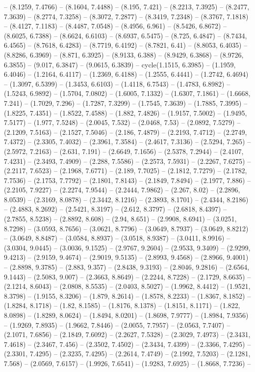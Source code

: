 -- (8.1259, 7.4766) -- (8.1604, 7.4488) -- (8.195, 7.421) -- (8.2213, 7.3925) -- (8.2477, 7.3639) -- (8.2774, 7.3258) -- (8.3072, 7.2877) -- (8.3419, 7.2348) -- (8.3767, 7.1818) -- (8.4127, 7.1183) -- (8.4487, 7.0548) -- (8.4956, 6.961) -- (8.5426, 6.8672) -- (8.6025, 6.7388) -- (8.6624, 6.6103) -- (8.6937, 6.5475) -- (8.725, 6.4847) -- (8.7434, 6.4565) -- (8.7618, 6.4283) -- (8.7719, 6.4192) -- (8.7821, 6.41) -- (8.8053, 6.4035) -- (8.8286, 6.3969) -- (8.871, 6.3925) -- (8.9133, 6.388) -- (8.9429, 6.3868) -- (8.9726, 6.3855) -- (9.017, 6.3847) -- (9.0615, 6.3839) -- cycle(1.1515, 6.3985) -- (1.1959, 6.4046) -- (1.2164, 6.4117) -- (1.2369, 6.4188) -- (1.2555, 6.4441) -- (1.2742, 6.4694) -- (1.3097, 6.5399) -- (1.3453, 6.6103) -- (1.4118, 6.7543) -- (1.4783, 6.8982) -- (1.5243, 6.9892) -- (1.5704, 7.0802) -- (1.6005, 7.1332) -- (1.6307, 7.1861) -- (1.6668, 7.241) -- (1.7029, 7.296) -- (1.7287, 7.3299) -- (1.7545, 7.3639) -- (1.7885, 7.3995) -- (1.8225, 7.4351) -- (1.8522, 7.4588) -- (1.882, 7.4826) -- (1.9157, 7.5002) -- (1.9495, 7.5177) -- (1.977, 7.5248) -- (2.0045, 7.532) -- (2.0468, 7.53) -- (2.0892, 7.5279) -- (2.1209, 7.5163) -- (2.1527, 7.5046) -- (2.186, 7.4879) -- (2.2193, 7.4712) -- (2.2749, 7.4372) -- (2.3305, 7.4032) -- (2.3961, 7.3584) -- (2.4617, 7.3136) -- (2.5294, 7.265) -- (2.5972, 7.2163) -- (2.631, 7.191) -- (2.6649, 7.1656) -- (2.5378, 7.2944) -- (2.4107, 7.4231) -- (2.3493, 7.4909) -- (2.288, 7.5586) -- (2.2573, 7.5931) -- (2.2267, 7.6275) -- (2.2117, 7.6523) -- (2.1968, 7.6771) -- (2.189, 7.7025) -- (2.1812, 7.7279) -- (2.1782, 7.7536) -- (2.1753, 7.7792) -- (2.1801, 7.8143) -- (2.1849, 7.8494) -- (2.1977, 7.886) -- (2.2105, 7.9227) -- (2.2274, 7.9544) -- (2.2444, 7.9862) -- (2.267, 8.02) -- (2.2896, 8.0539) -- (2.3169, 8.0878) -- (2.3442, 8.1216) -- (2.3893, 8.1701) -- (2.4344, 8.2186) -- (2.4883, 8.2692) -- (2.5421, 8.3197) -- (2.612, 8.3797) -- (2.6818, 8.4397) -- (2.7855, 8.5238) -- (2.8892, 8.608) -- (2.94, 8.651) -- (2.9908, 8.6941) -- (3.0251, 8.7298) -- (3.0593, 8.7656) -- (3.0621, 8.7796) -- (3.0649, 8.7937) -- (3.0649, 8.8212) -- (3.0649, 8.8487) -- (3.0584, 8.8937) -- (3.0518, 8.9387) -- (3.0411, 8.9916) -- (3.0304, 9.0445) -- (3.0036, 9.1525) -- (2.9767, 9.2604) -- (2.9533, 9.3409) -- (2.9299, 9.4213) -- (2.9159, 9.4674) -- (2.9019, 9.5135) -- (2.8993, 9.4568) -- (2.8966, 9.4001) -- (2.8898, 9.3785) -- (2.883, 9.357) -- (2.8438, 9.3193) -- (2.8046, 9.2816) -- (2.6564, 9.1443) -- (2.5083, 9.007) -- (2.3663, 8.8649) -- (2.2244, 8.7228) -- (2.1729, 8.6635) -- (2.1214, 8.6043) -- (2.0808, 8.5535) -- (2.0403, 8.5027) -- (1.9962, 8.4412) -- (1.9521, 8.3798) -- (1.9155, 8.3206) -- (1.879, 8.2614) -- (1.8578, 8.2233) -- (1.8367, 8.1852) -- (1.8284, 8.1718) -- (1.82, 8.1585) -- (1.8176, 8.1378) -- (1.8151, 8.1171) -- (1.822, 8.0898) -- (1.8289, 8.0624) -- (1.8494, 8.0201) -- (1.8698, 7.9777) -- (1.8984, 7.9356) -- (1.9269, 7.8935) -- (1.9662, 7.8446) -- (2.0055, 7.7957) -- (2.0563, 7.7407) -- (2.1071, 7.6856) -- (2.1849, 7.6092) -- (2.2627, 7.5328) -- (2.3029, 7.4973) -- (2.3431, 7.4618) -- (2.3467, 7.456) -- (2.3502, 7.4502) -- (2.3434, 7.4399) -- (2.3366, 7.4295) -- (2.3301, 7.4295) -- (2.3235, 7.4295) -- (2.2614, 7.4749) -- (2.1992, 7.5203) -- (2.1281, 7.568) -- (2.0569, 7.6157) -- (1.9926, 7.6541) -- (1.9283, 7.6925) -- (1.8668, 7.7236) -- 